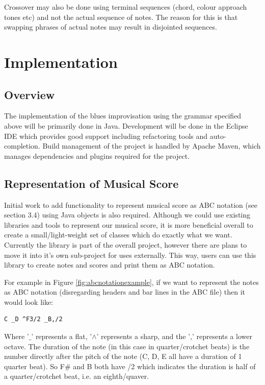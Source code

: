 \documentclass[pdftex,12pt,a4paper]{report}
\begin{document}
Crossover may also be done using terminal sequences (chord, colour approach tones etc) and not the actual sequence of notes. The reason for this is that swapping phrases of actual notes may result in disjointed sequences.

\chapter{Implementation}

\section{Overview}
The implementation of the blues improvisation using the grammar specified above will be primarily done in Java. Development will be done in the Eclipse IDE which provides good support including refactoring tools and auto-completion. Build management of the project is handled by Apache Maven, which manages dependencies and plugins required for the project. 

\section{Representation of Musical Score}
Initial work to add functionality to represent musical score as ABC notation (see section 3.4) using Java objects is also required. Although we could use existing libraries and tools to represent our musical score, it is more beneficial overall to create a small/light-weight set of classes which do exactly what we want. Currently the library is part of the overall project, however there are plans to move it into it's own sub-project for uses externally. This way, users can use this library to create notes and scores and print them as ABC notation.

For example in Figure \ref{fig:abcnotationexample}, if we want to represent the notes as ABC notation (disregarding headers and bar lines in the ABC file) then it would look like:

\begin{verbatim}
C _D ^F3/2 _B,/2
\end{verbatim}

Where '$\_$' represents a flat, '$\wedge$' represents a sharp, and the ',' represents a lower octave. The duration of the note (in this case in quarter/crotchet beats) is the number directly after the pitch of the note (C, D, E all have a duration of 1 quarter beat). So F\# and B both have /2 which indicates the duration is half of a quarter/crotchet beat, i.e. an eighth/quaver.
\end{document}

